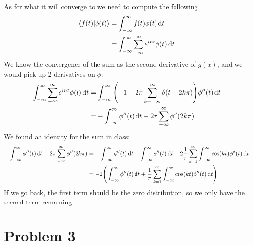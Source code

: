 \documentclass[12pt]{article}
\begin{document}
As for what it will converge to we need to compute the following
\begin{align*}
  \ip{f(t)}{\phi(t)}&=\int_{-\infty}^\infty f(t)\phi(t)\dd{t}\\
  &=\int_{-\infty}^\infty\sum_{-\infty}^{\infty} e^{int}\phi(t)\dd{t}\\
\end{align*}
We know the convergence of the sum as the second derivative of $g(x)$, and we would pick up 2 derivatives on $\phi$:
\begin{align*}
  \int_{-\infty}^\infty\sum_{-\infty}^{\infty} e^{int}\phi(t)\dd{t}&=
  \int_{-\infty}^\infty\qty(-1-2\pi\sum_{k=-\infty}^\infty\delta(t-2k\pi))
  \phi''(t)\dd{t}\\
  &=-\int_{-\infty}^\infty\phi''(t)\dd{t}-2\pi\sum_{-\infty}^\infty\phi''(2k\pi)
\end{align*}
We found an identity for the sum in class:
\begin{align*}
  -\int_{-\infty}^\infty\phi''(t)\dd{t}-2\pi\sum_{-\infty}^\infty\phi''(2k\pi)&=
  -\int_{-\infty}^\infty\phi''(t)\dd{t}-\int_{-\infty}^\infty\phi''(t)\dd{t}
  -2\frac1\pi\sum_{k=1}^\infty\int_{-\infty}^\infty\cos(kt)\phi''(t)\dd{t}\\
  &=-2\qty(\int_{-\infty}^\infty\phi''(t)\dd{t}
  +\frac1\pi\sum_{k=1}^\infty\int_{-\infty}^\infty\cos(kt)\phi''(t)\dd{t})
\end{align*}
If we go back, the first term should be the zero distribution, so we only have the second term remaining
\section*{Problem 3}
\end{document}
